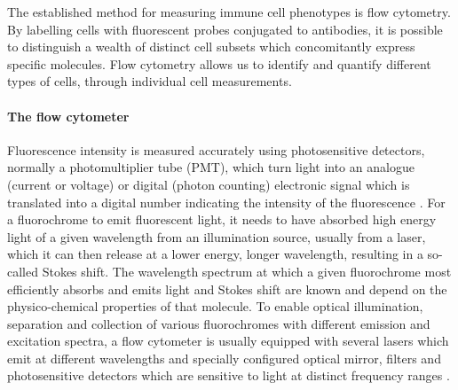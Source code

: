 
The established method for measuring immune cell phenotypes is flow cytometry.
By labelling cells with fluorescent probes conjugated to antibodies, it is possible to distinguish a wealth of distinct cell
subsets which concomitantly express specific molecules.
Flow cytometry allows us to identify and quantify different types of cells, through individual cell measurements.

\paragraph{The flow cytometer}
Fluorescence intensity is measured accurately using photosensitive detectors, normally a photomultiplier tube (PMT), which turn light into an analogue (current or voltage)
or digital (photon counting) electronic signal which is translated into a digital number indicating the intensity of the fluorescence \citep{Shapiro:2003vq,Snow:2004ci}.
For a fluorochrome to emit fluorescent light, it needs to have absorbed high energy light of a given wavelength from an illumination source, usually from a laser, which it can then release at a lower energy, longer wavelength, resulting in a so-called Stokes shift.
The wavelength spectrum at which a given fluorochrome most efficiently absorbs and emits light and Stokes shift are known and depend on the physico-chemical properties of that molecule.
To enable optical illumination, separation and collection of various fluorochromes with different emission and excitation spectra, a flow cytometer is usually equipped with several lasers which emit at different wavelengths and specially configured optical mirror, filters and photosensitive detectors which are sensitive to light at distinct frequency ranges \citep{Shapiro:2003vq}.

